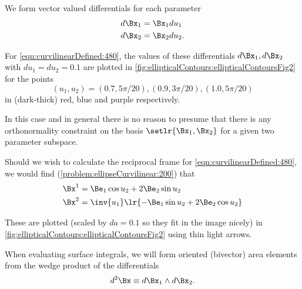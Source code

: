 We form vector valued differentials for each parameter
\begin{equation}\label{eqn:curvilinearDefined:500}
\begin{aligned}
d\Bx_{1} &= \Bx_1 du_1 \\
d\Bx_{2} &= \Bx_2 du_2.
\end{aligned}
\end{equation}

For \cref{eqn:curvilinearDefined:480},
the values of these differentials \( d\Bx_1, d\Bx_2 \) with \( du_1 = du_2 = 0.1 \) are plotted
in
\cref{fig:ellipticalContours:ellipticalContoursFig2}
for the points
\begin{equation}\label{eqn:curvilinearDefined:600}
(u_1, u_2) = (0.7, 5 \pi/20), (0.9, 3 \pi/20), (1.0, 5 \pi/20)
\end{equation}
in
(dark-thick) red, blue and purple respectively.

In this case and in general there is no reason to presume that there is any orthonormality constraint on the basis \( \setlr{ \Bx_{1}, \Bx_{2} } \) for a given two parameter subspace.

Should we wish to calculate the reciprocal frame
for \cref{eqn:curvilinearDefined:480}, we would find
(\cref{problem:ellipseCurvilinear:200}) that
\begin{equation}\label{eqn:curvilinearDefined:540}
\begin{aligned}
\Bx^{1} &= \Be_1 \cos u_2 + 2 \Be_2 \sin u_2 \\
\Bx^{2} &= \inv{u_1} \lr{ - \Be_1 \sin u_2 + 2 \Be_2 \cos u_2 }
\end{aligned}
\end{equation}

These are plotted (scaled by \( da = 0.1 \) so they fit in the image nicely) in \cref{fig:ellipticalContours:ellipticalContoursFig2} using thin light arrows.

When evaluating surface integrals, we will form
oriented (bivector) area elements from the wedge product of the differentials
\begin{equation}\label{eqn:curvilinearDefined:60}
d^2 \Bx \equiv d\Bx_{1} \wedge d\Bx_{2}.
\end{equation}

